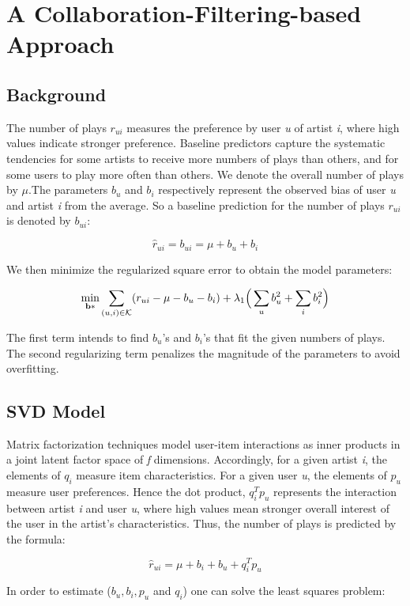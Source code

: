 \documentclass[11pt]{article}
\theoremstyle{definition}
\begin{document}
\section{\textbf{A Collaboration-Filtering-based Approach}}\label{sec:EDA}

\subsection{Background}
The number of plays $r_{ui}$ measures the preference by user \textit{u} of artist \textit{i}, where high values indicate stronger preference. Baseline predictors capture the systematic tendencies for some artists to receive more numbers of plays than others, and for some users to play more often than others. We denote the overall number of plays by $\mu$.The parameters $b_u$ and $b_i$ respectively represent the observed bias of user \textit{u} and artist \textit{i} from the average. So a baseline prediction for the number of plays $r_{ui}$ is denoted by $b_{ui}$:

$$\hat{r}_{ui}=b_{ui} =\mu+b_u+b_i$$

We then minimize the regularized square error to obtain the model parameters:


$$\min_{{\bf b}*} \sum_{(u, i) \in {\cal K}} (r_{ui} - \mu - b_u - b_i) + \lambda_1 \Big(\sum_u b_u^2+\sum_i b_i^2 \Big)$$

The first term intends to find $b_u$'s and $b_i$'s that fit the given numbers of plays. The second regularizing term penalizes the magnitude of the parameters to avoid overfitting. 

\subsection{SVD Model}
Matrix factorization techniques model user-item interactions as inner products in a joint latent factor space of \textit{f} dimensions. Accordingly, for a given artist \textit{i}, the elements of $q_i$ measure item characteristics. For a given user \textit{u}, the elements of $p_u$ measure user preferences. Hence the dot product, $q_i^Tp_u$ represents the interaction between artist \textit{i} and user \textit{u}, where high values mean stronger overall interest of the user in the artist's characteristics. Thus, the number of plays is predicted by the formula:

$$\hat{r}_{ui} =\mu+b_i+b_u+q_i^T p_u$$

In order to estimate ($b_u,b_i,p_u$ and $q_i$) one can solve the least squares problem:
\end{document}
